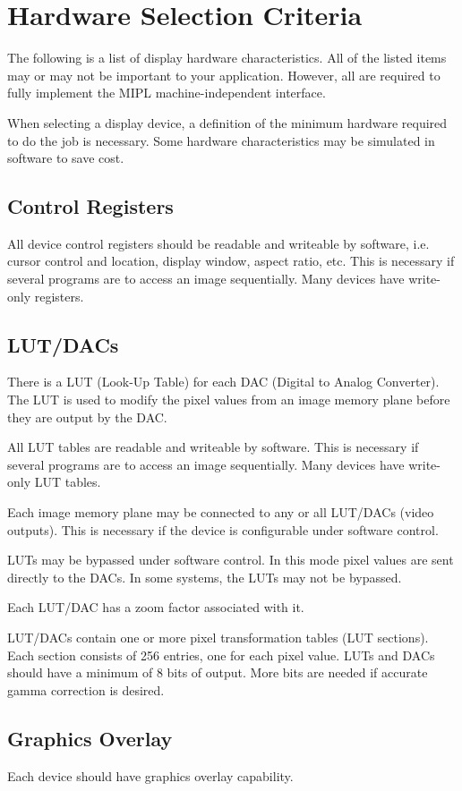 \section{Hardware Selection Criteria}
The following is a list of display hardware characteristics.
All of the listed items may or may not be important to your
application.  However, all are required to fully implement the MIPL
machine-independent interface.

When selecting a display device, a definition of the minimum
hardware required to do the job is necessary.  Some hardware
characteristics may be simulated in software to save cost.
\subsection{Control Registers}
All device control registers should be readable and writeable
by software, i.e. cursor control and location, display window,
aspect ratio, etc.  This is necessary if several programs are to
access an image sequentially.  Many devices have write-only
registers.
\subsection{LUT/DACs}
There is a LUT (Look-Up Table) for each DAC (Digital to
Analog Converter).  The LUT is used to modify the pixel values from
an image memory plane before they are output by the DAC.

All LUT tables are readable and writeable by software.  This
is necessary if several programs are to access an image
sequentially.  Many devices have write-only LUT tables.

Each image memory plane may be connected to any or all
LUT/DACs (video outputs).  This is necessary if the device is
configurable under software control.

LUTs may be bypassed under software control.  In this mode
pixel values are sent directly to the DACs.  In some systems, the LUTs
may not be bypassed.

Each LUT/DAC has a zoom factor associated with it.

LUT/DACs contain one or more pixel transformation tables (LUT
sections).  Each section consists of 256 entries, one for each pixel
value.  LUTs and DACs should have a minimum of 8 bits of output.  More
bits are needed if accurate gamma correction is desired.
\subsection{Graphics Overlay}
Each device should have graphics overlay capability.

